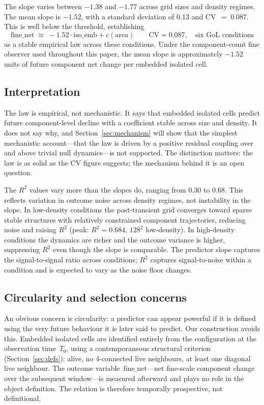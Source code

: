 \documentclass[aip,cha,preprint,nofootinbib]{revtex4-2}
\newcommand{\iso}{\mathrm{iso\_emb}}
\newcommand{\fnet}{\mathrm{fine\_net}}
\begin{document}
The slope varies between $-1.38$ and $-1.77$ across grid sizes and density
regimes.
The mean slope is $-1.52$, with a standard deviation of $0.13$ and
CV~$=~0.087$.
This is well below the threshold, establishing
\begin{equation}
\label{eq:law}
\fnet \;\approx\; -1.52\cdot\iso + c(\text{area})
\qquad\text{CV}=0.087,\quad\text{six GoL conditions}
\end{equation}
as a stable empirical law across these conditions.
Under the component-count fine observer used throughout this paper, the mean
slope is approximately $-1.52$ units of future component net change per
embedded isolated cell.

\subsection{Interpretation}

The law is empirical, not mechanistic.
It says that embedded isolated cells predict future component-level decline
with a coefficient stable across size and density.
It does not say why, and Section~\ref{sec:mechanism} will show that the
simplest mechanistic account---that the law is driven by a positive residual
coupling over and above trivial null dynamics---is not supported.
The distinction matters: the law is as solid as the CV figure suggests; the
mechanism behind it is an open question.

The $R^2$ values vary more than the slopes do, ranging from 0.30 to 0.68.
This reflects variation in outcome noise across density regimes, not
instability in the slope.
In low-density conditions the post-transient grid converges toward sparse
stable structures with relatively constrained component trajectories,
reducing noise and raising $R^2$ (peak: $R^2=0.684$, $128^2$ low-density).
In high-density conditions the dynamics are richer and the outcome variance
is higher, suppressing $R^2$ even though the slope is comparable.
The predictor slope captures the signal-to-signal ratio across conditions;
$R^2$ captures signal-to-noise within a condition and is expected to vary
as the noise floor changes.

\subsection{Circularity and selection concerns}

An obvious concern is circularity: a predictor can appear powerful if it is
defined using the very future behaviour it is later said to predict.
Our construction avoids this.
Embedded isolated cells are identified entirely from the configuration at the
observation time~$T_0$, using a contemporaneous structural criterion
(Section~\ref{sec:defs}): alive, no 4-connected live neighbours, at least one
diagonal live neighbour.
The outcome variable~$\fnet$---net fine-scale component change over the
subsequent window---is measured afterward and plays no role in the object
definition.
The relation is therefore temporally prospective, not definitional.
\end{document}
